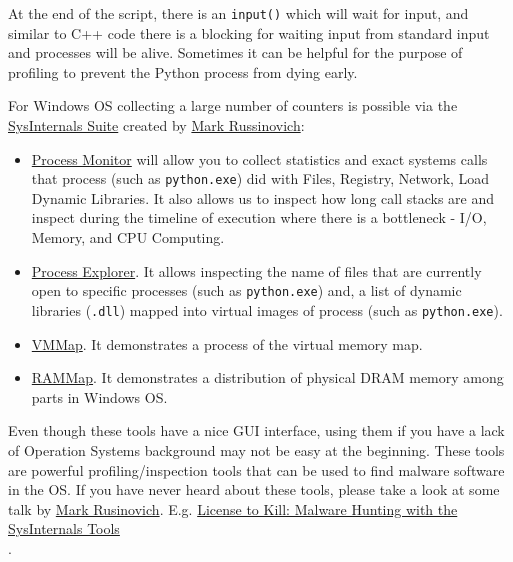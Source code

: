 \documentclass[
]{article}
\begin{document}
At the end of the script, there is an \texttt{input()} which will wait
for input, and similar to C++ code there is a blocking for waiting input
from standard input and processes will be alive. Sometimes it can be
helpful for the purpose of profiling to prevent the Python process from
dying early.

For Windows OS collecting a large number of counters is possible via the
\href{https://learn.microsoft.com/en-us/sysinternals/}{SysInternals
Suite} created by
\href{https://en.wikipedia.org/wiki/Mark_Russinovich}{Mark Russinovich}:

\begin{itemize}
\item
  \href{https://learn.microsoft.com/en-us/sysinternals/downloads/procmon}{Process
  Monitor} will allow you to collect statistics and exact systems calls
  that process (such as \texttt{python.exe}) did with Files, Registry,
  Network, Load Dynamic Libraries. It also allows us to inspect how long
  call stacks are and inspect during the timeline of execution where
  there is a bottleneck - I/O, Memory, and CPU Computing.
\item
  \href{https://learn.microsoft.com/en-us/sysinternals/downloads/process-explorer}{Process
  Explorer}. It allows inspecting the name of files that are currently
  open to specific processes (such as \texttt{python.exe}) and, a list
  of dynamic libraries (\texttt{.dll}) mapped into virtual images of
  process (such as \texttt{python.exe}).
\item
  \href{https://learn.microsoft.com/en-us/sysinternals/downloads/vmmap}{VMMap}.
  It demonstrates a process of the virtual memory map.
\item
  \href{https://learn.microsoft.com/en-us/sysinternals/downloads/RAMMap}{RAMMap}.
  It demonstrates a distribution of physical DRAM memory among parts in
  Windows OS.
\end{itemize}

Even though these tools have a nice GUI interface, using them if you
have a lack of Operation Systems background may not be easy at the
beginning. These tools are powerful profiling/inspection tools that can
be used to find malware software in the OS. If you have never heard
about these tools, please take a look at some talk by
\href{https://en.wikipedia.org/wiki/Mark_Russinovich}{Mark Rusinovich}.
E.g.
\href{https://www.youtube.com/watch?v=A_TPZxuTzBU\&ab_channel=MarkRussinovich}{License
to Kill: Malware Hunting with the SysInternals Tools\\
}.
\end{document}

